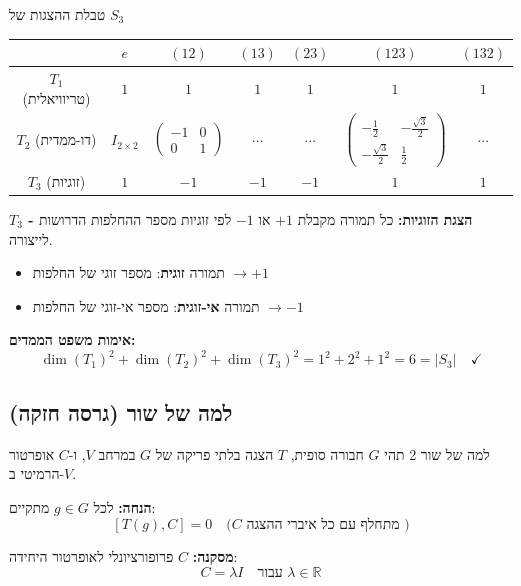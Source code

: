 \begin{summarybox}[label=box:S3_irreps]{טבלת ההצגות של $S_3$}
\begin{center}
\begin{tabular}{|c|c|c|c|c|c|c|}
\hline
& $e$ & $(12)$ & $(13)$ & $(23)$ & $(123)$ & $(132)$ \\ \hline
$T_1$ (טריוויאלית) & $1$ & $1$ & $1$ & $1$ & $1$ & $1$ \\ \hline
$T_2$ (דו-ממדית) & $I_{2\times 2}$ & $\begin{pmatrix} -1 & 0 \\ 0 & 1 \end{pmatrix}$ & $\cdots$ & $\cdots$ & $\begin{pmatrix} -\frac{1}{2} & -\frac{\sqrt{3}}{2} \\ -\frac{\sqrt{3}}{2} & \frac{1}{2} \end{pmatrix}$ & $\cdots$ \\ \hline
$T_3$ (זוגיות) & $1$ & $-1$ & $-1$ & $-1$ & $1$ & $1$ \\ \hline
\end{tabular}
\end{center}

\textbf{$T_3$ - הצגת הזוגיות:} כל תמורה מקבלת $+1$ או $-1$ לפי זוגיות מספר ההחלפות הדרושות לייצורה.
\begin{itemize}
    \item תמורה \textbf{זוגית}: מספר זוגי של החלפות $\to +1$
    \item תמורה \textbf{אי-זוגית}: מספר אי-זוגי של החלפות $\to -1$
\end{itemize}
\end{summarybox}

\textbf{אימות משפט הממדים:}
\[
\dim(T_1)^2 + \dim(T_2)^2 + \dim(T_3)^2 = 1^2 + 2^2 + 1^2 = 6 = |S_3| \quad \checkmark
\]

\subsection{למה של שור (גרסה חזקה)}

\begin{theorembox}[label=thm:schur2]{למה של שור 2}
תהי $G$ חבורה סופית, $T$ הצגה בלתי פריקה של $G$ במרחב $V$, ו-$C$ אופרטור הרמיטי ב-$V$.

\textbf{הנחה:} לכל $g \in G$ מתקיים:
\[
[T(g), C] = 0 \quad \text{(}C\text{ מתחלף עם כל איברי ההצגה  )}
\]

\textbf{מסקנה:} $C$ פרופורציונלי לאופרטור היחידה:
\[
\boxed{C = \lambda I \quad \text{עבור } \lambda \in \mathbb{R}}
\]
\end{theorembox}

